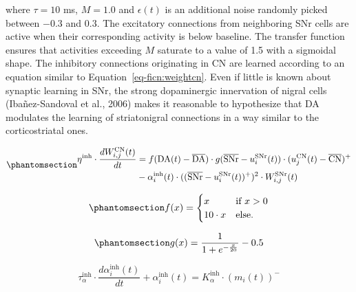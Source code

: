 \documentclass[
  11pt,
  a4paper,
]{scrbook}
\begin{document}
where \(\tau = 10\) ms, \(M = 1.0\) and \(\epsilon(t)\) is an additional
noise randomly picked between \(-0.3\) and \(0.3\). The excitatory
connections from neighboring SNr cells are active when their
corresponding activity is below baseline. The transfer function ensures
that activities exceeding \(M\) saturate to a value of 1.5 with a
sigmoidal shape. The inhibitory connections originating in CN are
learned according to an equation similar to
Equation~\ref{eq-ficn:weightcn}. Even if little is known about synaptic
learning in SNr, the strong dopaminergic innervation of nigral cells
(Ibañez-Sandoval et al., 2006) makes it reasonable to hypothesize that
DA modulates the learning of striatonigral connections in a way similar
to the corticostriatal ones.

\begin{equation}\phantomsection\label{eq-ficn:weightgpi}{
\begin{aligned}
    \eta^{\text{inh}} \cdot \frac{d W^{\text{CN}}_{i,j}(t)}{d t}  & = f(\text{DA}(t) - \overline{\text{DA}}) \cdot g( \overline{\text{SNr}} - u^{\text{SNr}}_i(t))  \cdot (u^{\text{CN}}_j(t) - \overline{\text{CN}})^+ \\
    &  - \alpha^{\text{inh}}_i(t) \cdot ( (\overline{\text{SNr}} -u^{\text{SNr}}_i(t) )^+ )^2 \cdot W^{\text{SNr}}_{i, j}(t)
\end{aligned}
}\end{equation}

\begin{equation}\phantomsection\label{eq-ficn:fgpi}{
    f(x)  =
     \begin{cases}
        x & \text{if $x > 0$}  \\
        10 \cdot x  & \text{else.}
     \end{cases}
}\end{equation}

\begin{equation}\phantomsection\label{eq-ficn:ggpi}{
    g(x)  =  \displaystyle\frac{1}{1 + e^{-\frac{x}{20}}} - 0.5
}\end{equation}

\[
    \tau^{\text{inh}}_{\alpha} \cdot \frac{d \alpha^{\text{inh}}_{i}(t)}{d t} + \alpha^{\text{inh}}_i(t)  = K^{\text{inh}}_{\alpha} \cdot ( m_i(t) )^-
\]
\end{document}
